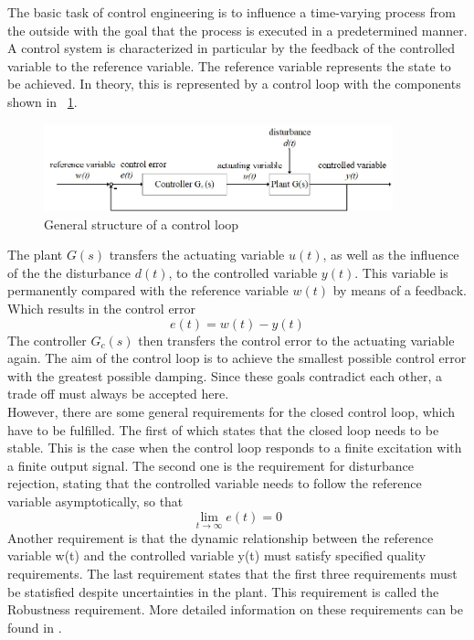 The basic task of control engineering is to influence a time-varying process from the outside with the goal that the process is executed in a predetermined manner. A control system is characterized in particular by the feedback of the controlled variable to the reference variable. The reference variable represents the state to be achieved.
In theory, this is represented by a control loop with the components shown in \figurename~{\ref{fig:control_loop}}.
\begin{figure}
  \centering
  \includegraphics[width=0.9\textwidth]{images/control_loop.jpg}
  \caption[General structure of a control loop]{General structure of a control loop}
  \label{fig:control_loop}
\end{figure}
The plant $G(s)$ transfers the actuating variable $u(t)$, as well as the influence of the the disturbance $d(t)$, to the controlled variable $y(t)$. This variable is permanently compared with the reference variable $w(t)$ by means of a feedback. Which results in the control error
\begin{equation}
  e(t) = w(t) - y(t)
 \label{eq:e_t}
\end{equation}
The controller $G_{c}(s)$ then transfers the control error to the actuating variable again. The aim of the control loop is to achieve the smallest possible control error with the greatest possible damping. Since these goals contradict each other, a trade off must always be accepted here.\cite{Reg_17}
\\However, there are some general requirements for the closed control loop, which have to be fulfilled. The first of which states that the closed loop needs to be stable. This is the case when the control loop responds to a finite excitation with a finite output signal. The second one is the requirement for disturbance rejection, stating that the controlled variable needs to follow the reference variable asymptotically, so that
\begin{equation}
    \lim\limits_{t \rightarrow \infty}{e(t)} = 0
 \label{eq:lim_e}
\end{equation}
Another requirement is that the dynamic relationship between the reference variable w(t) and the controlled variable y(t) must satisfy specified quality requirements.  The last requirement states that the first three requirements must be statisfied despite uncertainties in the plant. This requirement is called the Robustness requirement. More detailed information on these requirements can be found in \cite{Reg_10}.

